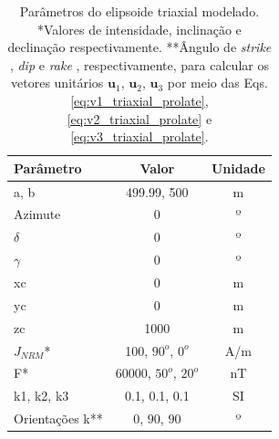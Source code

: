 \begin{table}[h!]
	\begin{center}
		\begin{tabular}{|l|c|c|}
			\hline
			\textbf{Parâmetro}  & \textbf{Valor} & \textbf{Unidade} \\
			\hline 
			a, b   & 499.99, 500 & m\\
			\hline
			Azimute   & $0$ & º\\
			\hline
			$\delta$    & $0$ & º\\
			\hline
			$\gamma$   & $0$  & º\\
			\hline
			xc   & 0  & m\\
			\hline          
			yc   & 0  & m\\
			\hline                
			zc   & 1000  & m\\
			\hline
			$J_{NRM}$*  & 100, $90^o$, $0^o$  & A/m\\
			\hline
			F*    & 60000, $50^o$, $20^o$ & nT \\
			\hline
			k1, k2, k3   & 0.1, 0.1, 0.1 & SI \\
			\hline
			Orientações k**   & $0$, $90$, $90$ & º \\
			\hline
		\end{tabular}
		\caption{Parâmetros do elipsoide triaxial modelado. *Valores de intensidade, inclinação e declinação respectivamente. **Ângulo de \textit{strike} , \textit{dip}  e \textit{rake} , respectivamente, para calcular os vetores unitários $\mathbf{u}_{1}$, $\mathbf{u}_{2}$, $\mathbf{u}_{3}$ por meio das Eqs. \ref{eq:v1_triaxial_prolate}, \ref{eq:v2_triaxial_prolate} e \ref{eq:v3_triaxial_prolate}.}
	\end{center}
	\label{tab:triaxial_oblate2}
\end{table}

